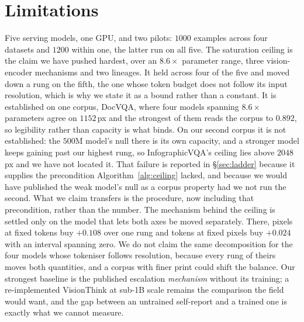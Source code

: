 \documentclass[10pt,twocolumn]{article}
\theoremstyle{plain}
\begin{document}
\section{Limitations}
\label{sec:limitations}

Five serving models, one GPU, and two pilots: $1000$ examples across four
datasets and $1200$ within one, the latter run on all five. The saturation
ceiling is the claim we have pushed hardest, over an $8.6\times$ parameter
range, three vision-encoder mechanisms and two lineages. It held across four of
the five and moved down a rung on the fifth, the one whose token budget does
not follow its input resolution, which is why we state it as a bound rather
than a constant. It is established on one corpus, DocVQA, where four models
spanning $8.6\times$ parameters agree on $1152$\,px and the strongest of them
reads the corpus to $0.892$, so legibility rather than capacity is what binds.
On our second corpus it is not established: the $500$M model's null there is
its own capacity, and a stronger model keeps gaining past our highest rung, so
InfographicVQA's ceiling lies above $2048$\,px and we have not located it. That
failure is reported in \S\ref{sec:ladder} because it supplies the precondition
Algorithm~\ref{alg:ceiling} lacked, and because we would have published the weak model's null
as a corpus property had we not run the second. What we claim transfers is the
procedure, now including that precondition, rather than the number. The mechanism behind the ceiling is settled only on the model that lets both
axes be moved separately. There, pixels at fixed tokens buy $+0.108$ over one
rung and tokens at fixed pixels buy $+0.024$ with an interval spanning zero. We
do not claim the same decomposition for the four models whose tokeniser follows
resolution, because every rung of theirs moves both quantities, and a
corpus with finer print could shift the balance.
Our strongest baseline is
the published escalation \emph{mechanism} without its training; a re-implemented
VisionThink at sub-1B scale remains the comparison the field would want, and the
gap between an untrained self-report and a trained one is exactly what we cannot
measure.
\end{document}
